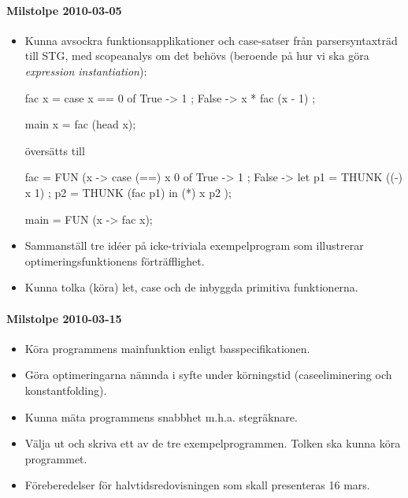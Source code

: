 \documentclass[../Appendix]{subfiles}
\begin{document}
\paragraph{Milstolpe 2010-03-05}
\begin{itemize}
\item Kunna avsockra funktionsapplikationer och case-satser från parsersyntaxträd
till STG, med scopeanalys om det behövs (beroende på hur vi ska göra
\textit{expression instantiation}):

\begin{codeEx}
fac x = case x == 0 of
	{ True -> 1
	; False -> x * fac (x - 1)
    };

main x = fac (head x);
\end{codeEx}
översätts till

\begin{codeEx}
fac = FUN (x -> case (==) x 0 of 
    { True  -> 1
    ; False -> let { p1 = THUNK ((-) x 1)
	               ; p2 = THUNK (fac p1)
	               } in (*) x p2 
    });

main = FUN (x -> fac x);
\end{codeEx}

\item Sammanställ tre idéer på icke-triviala exempelprogram som illustrerar
optimeringsfunktionens förträfflighet.
\item Kunna tolka (köra) let, case och de inbyggda primitiva funktionerna.
\end{itemize}

\paragraph{Milstolpe 2010-03-15}
\begin{itemize}
\item Köra programmens mainfunktion enligt basspecifikationen.
\item Göra optimeringarna nämnda i syfte under körningstid (caseeliminering
och konstantfolding).
\item Kunna mäta programmens snabbhet m.h.a. stegräknare.
\item Välja ut och skriva ett av de tre exempelprogrammen. Tolken ska kunna
köra programmet.
\item Föreberedelser för halvtidsredovisningen som skall presenteras 16
mars.
\end{itemize}
\end{document}
